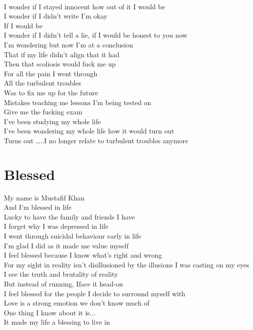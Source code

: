 \documentclass[12pt, b5paper, oneside]{book}
\begin{document}
\\I wonder if I stayed innocent how out of it I would be
\\I wonder if I didn't write I'm okay
\\If I would be
\\I wonder if I didn't tell a lie, if I would be honest to you now
\\I'm wondering but now I'm at a conclusion
\\That if my life didn't align that it had
\\Then that scoliosis would fuck me up
\\For all the pain I went through
\\All the turbulent troubles
\\Was to fix me up for the future
\\Mistakes teaching me lessons I'm being tested on
\\Give me the fucking exam
\\I've been studying my whole life
\\I've been wondering my whole life how it would turn out
\\Turns out \dots ..I no longer relate to turbulent troubles anymore 
\newpage
\section{Blessed}
My name is Mustafif Khan
\\And I'm blessed in life
\\Lucky to have the family and friends I have
\\I forget why I was depressed in life
\\I went through suicidal behaviour early in life
\\I'm glad I did as it made me value myself
\\I feel blessed because I know what's right and wrong
\\For my sight in reality isn't disillusioned by the illusions I was casting on my eyes
\\I see the truth and brutality of reality
\\But instead of running, Iface it head-on
\\I feel blessed for the people I decide to surround myself with
\\Love is a strong emotion we don't know much of
\\One thing I know about it is...
\\It made my life a blessing to live in 
\newpage
\end{document}
